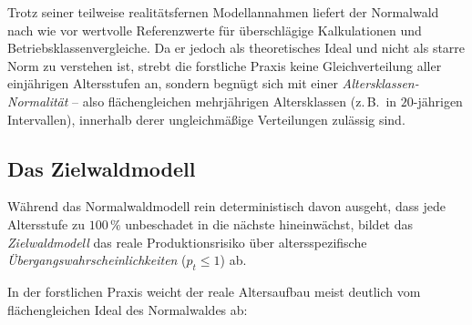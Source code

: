 \documentclass[twocolumn, paper=a4, fontsize=10pt]{scrartcl}
\begin{document}
Trotz seiner teilweise realitätsfernen Modellannahmen liefert der Normalwald nach wie vor wertvolle Referenzwerte für überschlägige Kalkulationen und Betriebsklassenvergleiche. Da er jedoch als theoretisches Ideal und nicht als starre Norm zu verstehen ist, strebt die forstliche Praxis keine Gleichverteilung aller einjährigen Altersstufen an, sondern begnügt sich mit einer \emph{Altersklassen-Normalität} -- also flächengleichen mehrjährigen Altersklassen (z.\,B.\ in $20$-jährigen Intervallen), innerhalb derer ungleichmäßige Verteilungen zulässig sind.

\subsection{Das Zielwaldmodell}

Während das Normalwaldmodell rein deterministisch davon ausgeht, dass jede Altersstufe zu $100\,\%$ unbeschadet in die nächste hineinwächst, bildet das \emph{Zielwaldmodell} das reale Produktionsrisiko über altersspezifische \emph{Übergangswahrscheinlichkeiten} ($p_t \le 1$) ab.

In der forstlichen Praxis weicht der reale Altersaufbau meist deutlich vom flächengleichen Ideal des Normalwaldes ab:
\end{document}
